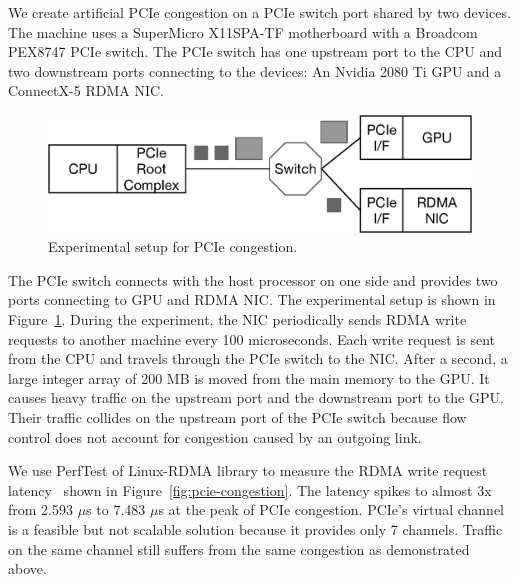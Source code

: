 We create artificial PCIe congestion on a PCIe switch port shared by two devices. 
%
The machine uses a SuperMicro X11SPA-TF motherboard with a Broadcom PEX8747 PCIe switch. 
%
The PCIe switch has one upstream port to the CPU and two downstream ports connecting to the devices: An Nvidia 2080 Ti GPU and a ConnectX-5 RDMA NIC.
%
\begin{figure}[ht!]  
    \centering
    \includegraphics[width=0.8\columnwidth]{figure/aurelia/pcie-exp.eps}  
    \caption{Experimental setup for PCIe congestion.}
    \label{fig:pcie-experiment}        
\end{figure}
%
The PCIe switch connects with the host processor on one side and provides two ports connecting to GPU and RDMA NIC.
%
The experimental setup is shown in Figure~\ref{fig:pcie-experiment}.
%
During the experiment, the NIC periodically sends RDMA write requests to another machine every 100 microseconds. 
%
Each write request is sent from the CPU and travels through the PCIe switch to the NIC. 
%
After a second, a large integer array of 200 MB is moved from the main memory to the GPU. It causes heavy traffic on the upstream port and the downstream port to the GPU.
%
Their traffic collides on the upstream port of the PCIe switch because flow control does not account for congestion caused by an outgoing link.

We use PerfTest of Linux-RDMA library to measure the RDMA write request latency~\cite{ofed-perftest} shown in Figure~\ref{fig:pcie-congestion}. The latency spikes to almost 3x from 2.593 $\mu$s to 7.483 $\mu$s at the peak of PCIe congestion. 
%
PCIe's virtual channel is a feasible but not scalable solution because it provides only 7 channels. 
%
Traffic on the same channel still suffers from the same congestion as demonstrated above. 
 
